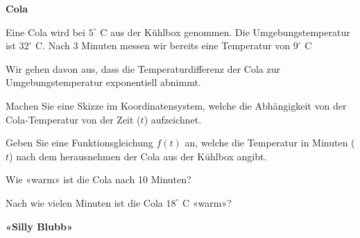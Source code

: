 \platzFuerBerechnungenBisEndeSeite{}




\bbwActAufgabenNr{} \textbf{Cola}

Eine Cola wird bei $5^\circ \textrm{ C}$ aus der Kühlbox genommen. Die
Umgebungstemperatur ist $32^\circ \textrm{ C}$. Nach 3 Minuten messen
wir bereits eine Temperatur von $9^\circ \textrm{ C}$ 

Wir gehen davon aus, dass die Temperaturdifferenz der Cola zur
Umgebungstemperatur exponentiell abnimmt.

\begin{bbwAufgabenBlock}
\item Machen Sie eine Skizze im Koordinatensystem, welche die
Abhängigkeit von der Cola-Temperatur von der Zeit ($t$) aufzeichnet.


\item Geben Sie eine Funktionsgleichung $f(t)$ an, welche die
Temperatur in Minuten ($t$) nach dem herausnehmen der Cola aus der Kühlbox
angibt.


\item Wie «warm» ist die Cola nach 10 Minuten?


\item Nach wie vielen Minuten ist die Cola $18^\circ \textrm{ C}$
«warm»?


\end{bbwAufgabenBlock}


\platzFuerBerechnungenBisEndeSeite{}




\bbwActAufgabenNr{} \textbf{«Silly Blubb»}

